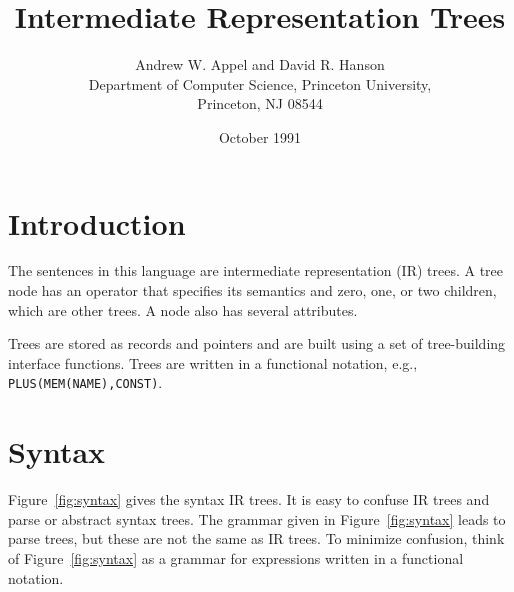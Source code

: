 

\title{Intermediate Representation Trees}

\author{Andrew W. Appel and David R. Hanson \\
Department of Computer Science, Princeton University, \\
Princeton, NJ 08544}

\date{October 1991}

\maketitle

\section{Introduction}

The sentences in this language are intermediate representation (IR) trees.
A tree node has
an operator that specifies its semantics and zero, one, or two children, which are
other trees. A node also has several attributes.

Trees are stored as records and pointers and
are built using a set of tree-building interface functions.
Trees are written in a functional notation, e.g.,
\verb|PLUS(MEM(NAME),CONST)|.

\section{Syntax}

Figure~\ref{fig:syntax} gives the syntax IR trees.
It is easy to confuse IR trees and parse or abstract syntax trees.
The grammar given in Figure~\ref{fig:syntax} leads to parse trees,
but these are not the same as IR trees.
To minimize confusion, think of
Figure~\ref{fig:syntax} as a grammar for expressions written in a functional notation.

